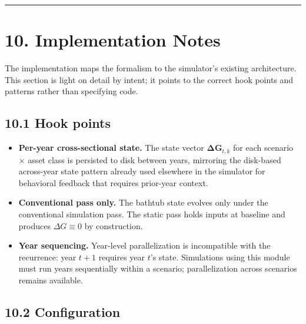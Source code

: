 \documentclass[11pt]{article}
\begin{document}
\par\medskip\hrule\medskip

\section*{10. Implementation Notes}

The implementation maps the formalism to the simulator's existing architecture. This section is light on detail by intent; it points to the correct hook points and patterns rather than specifying code.

\subsection*{10.1 Hook points}

\begin{itemize}
  \item \textbf{Per-year cross-sectional state.} The state vector $\boldsymbol{\Delta
  G}_{t, k}$ for each scenario × asset class is persisted to disk between
    years, mirroring the disk-based across-year state pattern already used
    elsewhere in the simulator for behavioral feedback that requires
    prior-year context.
\end{itemize}
\begin{itemize}
  \item \textbf{Conventional pass only.} The bathtub state evolves only under the
    conventional simulation pass. The static pass holds inputs at baseline
    and produces $\Delta G \equiv 0$ by construction.
\end{itemize}
\begin{itemize}
  \item \textbf{Year sequencing.} Year-level parallelization is incompatible with the
    recurrence: year $t+1$ requires year $t$'s state. Simulations using this
    module must run years sequentially within a scenario; parallelization
    across scenarios remains available.
\end{itemize}

\subsection*{10.2 Configuration}
\end{document}
